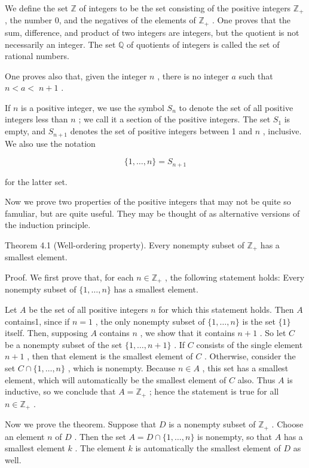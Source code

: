 \documentclass[10pt]{article}
\begin{document}
We define the set \(\mathbb{Z}\) of integers to be the set consisting of the positive integers \({\mathbb{Z}}_{ + }\) , the number 0, and the negatives of the elements of \({\mathbb{Z}}_{ + }\) . One proves that the sum, difference, and product of two integers are integers, but the quotient is not necessarily an integer. The set \(\mathbb{Q}\) of quotients of integers is called the set of rational numbers.

One proves also that, given the integer \(n\) , there is no integer \(a\) such that \(n < a < \; n + 1\) .

If \(n\) is a positive integer, we use the symbol \({S}_{n}\) to denote the set of all positive integers less than \(n\) ; we call it a section of the positive integers. The set \({S}_{1}\) is empty, and \({S}_{n + 1}\) denotes the set of positive integers between 1 and \(n\) , inclusive. We also use the notation

\[
\{ 1,\ldots ,n\}  = {S}_{n + 1}
\]

for the latter set.

Now we prove two properties of the positive integers that may not be quite so famuliar, but are quite useful. They may be thought of as alternative versions of the induction principle.

Theorem 4.1 (Well-ordering property). Every nonempty subset of \({\mathbb{Z}}_{ + }\) has a smallest element.

Proof. We first prove that, for each \(n \in  {\mathbb{Z}}_{ + }\) , the following statement holds: Every nonempty subset of \(\{ 1,\ldots ,n\}\) has a smallest element.

Let \(A\) be the set of all positive integers \(n\) for which this statement holds. Then \(A\) contains1, since if \(n = 1\) , the only nonempty subset of \(\{ 1,\ldots ,n\}\) is the set \(\{ 1\}\) itself. Then, supposing \(A\) contains \(n\) , we show that it contains \(n + 1\) . So let \(C\) be a nonempty subset of the set \(\{ 1,\ldots ,n + 1\}\) . If \(C\) consists of the single element \(n + 1\) , then that element is the smallest element of \(C\) . Otherwise, consider the set \(C \cap  \{ 1,\ldots ,n\}\) , which is nonempty. Because \(n \in  A\) , this set has a smallest element, which will automatically be the smallest element of \(C\) also. Thus \(A\) is inductive, so we conclude that \(A = {\mathbb{Z}}_{ + }\) ; hence the statement is true for all \(n \in  {\mathbb{Z}}_{ + }\) .

Now we prove the theorem. Suppose that \(D\) is a nonempty subset of \({\mathbb{Z}}_{ + }\) . Choose an element \(n\) of \(D\) . Then the set \(A = D \cap  \{ 1,\ldots ,n\}\) is nonempty, so that \(A\) has a smallest element \(k\) . The element \(k\) is automatically the smallest element of \(D\) as well.
\end{document}
